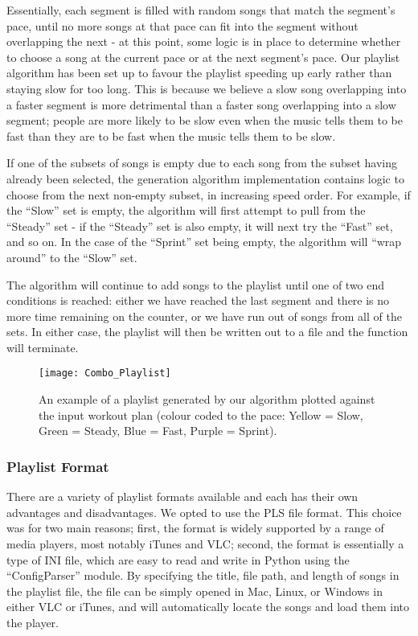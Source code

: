 \documentclass{article}
\begin{document}
Essentially, each segment is filled with random songs that match the segment's pace, until no more songs at that pace can fit into the segment without overlapping the next - at this point, some logic is in place to determine whether to choose a song at the current pace or at the next segment's pace. Our playlist algorithm has been set up to favour the playlist speeding up early rather than staying slow for too long. This is because we believe a slow song overlapping into a faster segment is more detrimental than a faster song overlapping into a slow segment; people are more likely to be slow even when the music tells them to be fast than they are to be fast when the music tells them to be slow.

If one of the subsets of songs is empty due to each song from the subset having already been selected, the generation algorithm implementation contains logic to choose from the next non-empty subset, in increasing speed order. For example, if the ``Slow'' set is empty, the algorithm will first attempt to pull from the ``Steady'' set - if the ``Steady'' set is also empty, it will next try the ``Fast'' set, and so on. In the case of the ``Sprint'' set being empty, the algorithm will ``wrap around'' to the ``Slow'' set.

The algorithm will continue to add songs to the playlist until one of two end conditions is reached: either we have reached the last segment and there is no more time remaining on the counter, or we have run out of songs from all of the sets. In either case, the playlist will then be written out to a file and the function will terminate.

\begin{figure}[h]
\centering
\captionsetup{justification=centering}
\texttt{[image: Combo\_Playlist]}
\caption{An example of a playlist generated by our algorithm plotted against the input workout plan (colour coded to the pace: Yellow = Slow, Green = Steady, Blue = Fast, Purple = Sprint).}
\label{fig:playlist}
\end{figure}

\subsubsection{Playlist Format}

There are a variety of playlist formats available \cite{Gonze} and each has their own advantages and disadvantages. We opted to use the PLS file format. This choice was for two main reasons; first, the format is widely supported by a range of media players, most notably iTunes and VLC; second, the format is essentially a type of INI file, which are easy to read and write in Python using the ``ConfigParser'' module. By specifying the title, file path, and length of songs in the playlist file, the file can be simply opened in Mac, Linux, or Windows in either VLC or iTunes, and will automatically locate the songs and load them into the player.
\end{document}
